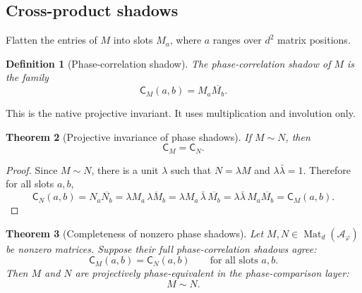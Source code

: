 \documentclass[11pt]{article}
\newtheorem{definition}{Definition}[section]
\newtheorem{theorem}[definition]{Theorem}
\newcommand{\ph}{\varphi}
\newcommand{\A}{\mathcal A}
\newcommand{\Mat}{\operatorname{Mat}}
\newcommand{\shadow}{\mathsf C}
\begin{document}
\subsection{Cross-product shadows}

Flatten the entries of $M$ into slots $M_a$, where $a$ ranges over $d^2$ matrix positions.

\begin{definition}[Phase-correlation shadow]
The phase-correlation shadow of $M$ is the family
\[
    \shadow_M(a,b)=M_a\overline{M_b}.
\]
\end{definition}

This is the native projective invariant.  It uses multiplication and involution only.

\begin{theorem}[Projective invariance of phase shadows]
If $M\sim N$, then
\[
    \shadow_M=\shadow_N.
\]
\end{theorem}

\begin{proof}
Since $M\sim N$, there is a unit $\lambda$ such that $N=\lambda M$ and $\lambda\bar\lambda=1$.  Therefore for all slots $a,b$,
\[
    \shadow_N(a,b)
    =
    N_a\overline{N_b}
    =
    \lambda M_a\,\overline{\lambda M_b}
    =
    \lambda M_a\,\bar\lambda\,\overline{M_b}
    =
    \lambda\bar\lambda\,M_a\overline{M_b}
    =
    \shadow_M(a,b).
\]
\end{proof}

\begin{theorem}[Completeness of nonzero phase shadows]
Let $M,N\in\Mat_d(\A_\ph)$ be nonzero matrices.  Suppose their full phase-correlation shadows agree:
\[
    \shadow_M(a,b)=\shadow_N(a,b)
    \qquad
    \text{for all slots }a,b.
\]
Then $M$ and $N$ are projectively phase-equivalent in the phase-comparison layer:
\[
    M\sim N.
\]
\end{theorem}
\end{document}
